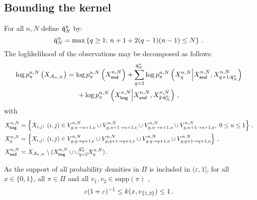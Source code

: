 \subsection{Bounding the kernel}
For all $n,N$ define $\bar{\mathsf{q}}^{n}_{N}$ by:
\begin{equation}
\label{eq:ordermax}
\bar{\mathsf{q}}^{n}_{N} = \max\left\{q\ge 1;\, n+1 + 2(q-1)(n-1)\le N\right\}\,.
\end{equation}
The loglikelihood of the observations may be decomposed as follows:
\begin{multline*}
\log p_{\pi}^{n,N}\left(X_{\mathcal{A}_{n,N}}\right) = \log p_{\pi}^{n,N}\left(X_{\mathsf{end}}^{n,N}\right) + \sum_{q=2}^{\bar{\mathsf{q}}^{n}_{N}}  \log p_{\pi}^{n,N}\left(X_{q}^{n,N}\middle|X_{\mathsf{end}}^{n,N},X_{q+1:\bar{\mathsf{q}}^{n}_{N}}^{n,N}\right) \\
+  \log p_{\pi}^{n,N}\left(X_{\mathsf{beg}}^{n,N}\middle|X_{\mathsf{end}}^{n,N},X_{2:\bar{\mathsf{q}}^{n}_{N}}^{n,N}\right)\,,
\end{multline*}
with 
\begin{align*}
X_{\mathsf{beg}}^{n,N} & = \left\{X_{i,j};\;(i,j)\in V_{g,u\to u+1,e}^{n,N}\cup V_{g,u+1\to u+1,e}^{n,N}\cup V_{g,u\to u+1,o}^{n,N}\cup V_{g,u+1\to u+1,o}^{n,N},\;0\le u\le 1\right\}\,,\\
X_{q}^{n,N}                   & = \left\{X_{i,j};\;(i,j)\in V_{g,q\to q+1,e}^{n,N}\cup V_{g,q+1\to q+1,e}^{n,N}\cup V_{g,q\to q+1,o}^{n,N}\cup V_{g,q+1\to q+1,o}^{n,N}\right\} \,,\\
X_{\mathsf{end}}^{n,N} & = X_{\mathcal{A}_{n,N}}\setminus (X_{\mathsf{beg}}^{n,N}\cup\cup_{q=2}^{\bar{\mathsf{q}}^{n}_{N}} X_{q}^{n,N} )\,.
\end{align*}

As the support of all probability densities in $\Pi$ is included in $(\varepsilon,1]$, for all $x\in\{0,1\}$, all $\pi\in\Pi$ and all $v_1,v_2 \in \mathrm{supp}(\pi)$ , 
\begin{equation}
\label{eq:bound:likelihood}
\varepsilon(1+\varepsilon)^{-1}\le k(x,v_{\{1,2\}})\le 1\,.
\end{equation}

